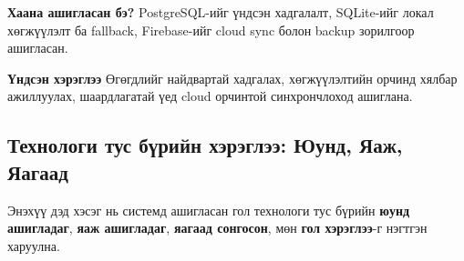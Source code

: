 \documentclass[12pt,a4paper]{report}
\begin{document}
\textbf{Хаана ашигласан бэ?} PostgreSQL-ийг үндсэн хадгалалт, SQLite-ийг локал хөгжүүлэлт ба fallback, Firebase-ийг cloud sync болон backup зорилгоор ашигласан.

\textbf{Үндсэн хэрэглээ} Өгөгдлийг найдвартай хадгалах, хөгжүүлэлтийн орчинд хялбар ажиллуулах, шаардлагатай үед cloud орчинтой синхрончлоход ашиглана.

\subsection{Технологи тус бүрийн хэрэглээ: Юунд, Яаж, Яагаад}

Энэхүү дэд хэсэг нь системд ашигласан гол технологи тус бүрийн \textbf{юунд ашигладаг}, \textbf{яаж ашигладаг}, \textbf{яагаад сонгосон}, мөн \textbf{гол хэрэглээ}-г нэгтгэн харуулна.
\end{document}
